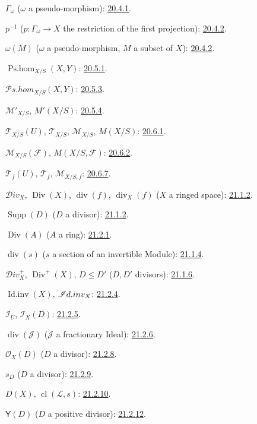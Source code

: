 $\Gamma_\omega$ ($\omega$ a pseudo-morphism): {\hyperref[IV.20]{20.4.1}}.

$p^{-1}$ ($p:\Gamma_\omega\to X$ the restriction of the first
projection): {\hyperref[IV.20.4.2]{20.4.2}}.

$\omega(M)$ ($\omega$ a pseudo-morphism, $M$ a subset of $X$):
{\hyperref[IV.20.4.2]{20.4.2}}.

$\operatorname{Ps.hom}_{X/S}(X,Y)$: {\hyperref[IV.20]{20.5.1}}.

$\mathcal P\!s.\mathit{hom}_{X/S}(X,Y)$: {\hyperref[IV.20.5.3]{20.5.3}}.

$\mathcal M'_{X/S}$, $M'(X/S)$: {\hyperref[IV.20]{20.5.4}}.

$\mathcal T_{X/S}(U)$, $\mathcal T_{X/S}$, $\mathcal M_{X/S}$,
$M(X/S)$: {\hyperref[IV.20]{20.6.1}}.

$\mathcal M_{X/S}(\mathcal F)$, $M(X/S,\mathcal F)$:
{\hyperref[IV.20]{20.6.2}}.

$\mathcal T_f(U)$, $\mathcal T_f$, $\mathcal M_{X/S,f}$:
{\hyperref[IV.20]{20.6.7}}.

$\mathcal{D}iv_X$, $\operatorname{Div}(X)$, $\operatorname{div}(f)$,
$\operatorname{div}_X(f)$ ($X$ a ringed space): {\hyperref[IV.21.1.2]{21.1.2}}.

$\operatorname{Supp}(D)$ ($D$ a divisor): {\hyperref[IV.21.1.2]{21.1.2}}.

$\operatorname{Div}(A)$ ($A$ a ring): {\hyperref[IV.21.2.1]{21.2.1}}.

$\operatorname{div}(s)$ ($s$ a section of an invertible Module):
{\hyperref[IV.21.1.4]{21.1.4}}.

$\mathcal{D}iv_X^+$, $\operatorname{Div}^+(X)$, $D\leq D'$
($D,D'$ divisors): {\hyperref[IV.21.1.6]{21.1.6}}.

$\operatorname{Id.inv}(X)$, $\mathscr{I}d.inv_X$:
{\hyperref[IV.21.2.4]{21.2.4}}.

$\mathcal I_U$, $\mathcal I_X(D)$: {\hyperref[IV.21.2.5]{21.2.5}}.

$\operatorname{div}(\mathcal J)$ ($\mathcal J$ a fractionary Ideal):
{\hyperref[IV.21.2.6]{21.2.6}}.

$\mathcal O_X(D)$ ($D$ a divisor): {\hyperref[IV.21.2.8]{21.2.8}}.

$s_D$ ($D$ a divisor): {\hyperref[IV.21.2.9]{21.2.9}}.

$D(X)$, $\operatorname{cl}(\mathcal L,s)$: {\hyperref[IV.21.2.10]{21.2.10}}.

$\boldsymbol{\mathsf{Y}}(D)$ ($D$ a positive divisor):
{\hyperref[IV.21.2.12]{21.2.12}}.

